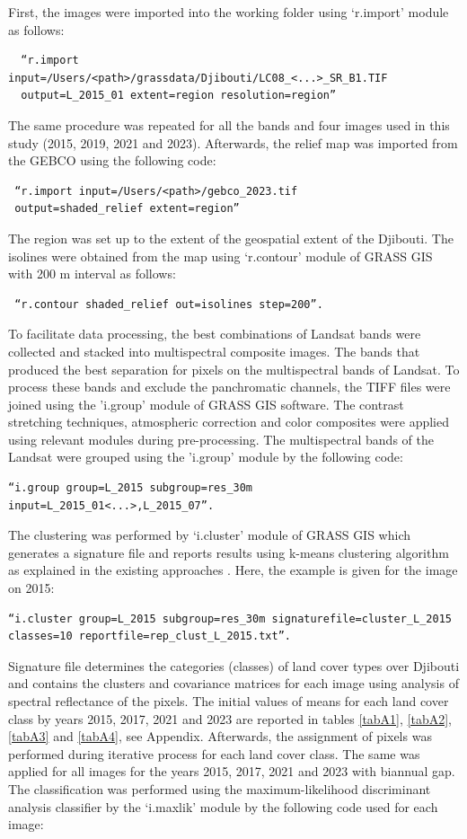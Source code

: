 \documentclass[jimaging,article,submit,pdftex,moreauthors]{Definitions/mdpi}
\begin{document}
First, the images were imported into the working folder using ‘r.import’ module as follows: 
\begin{verbatim}
  “r.import input=/Users/<path>/grassdata/Djibouti/LC08_<...>_SR_B1.TIF 
  output=L_2015_01 extent=region resolution=region”
\end{verbatim}
The same procedure was repeated for all the bands and four images used in this study (2015, 2019, 2021 and 2023). Afterwards, the relief map was imported from the GEBCO using the following code: 
\begin{verbatim}
 “r.import input=/Users/<path>/gebco_2023.tif 
 output=shaded_relief extent=region”
\end{verbatim}
The region was set up to the extent of the geospatial extent of the Djibouti. The isolines were obtained from the map using ‘r.contour’ module of GRASS GIS with 200 m interval as follows: 
\begin{verbatim}
 “r.contour shaded_relief out=isolines step=200”.
\end{verbatim}
 
To facilitate data processing, the best combinations of Landsat bands were collected and stacked into multispectral composite images. The bands that produced the best separation for pixels on the multispectral bands of Landsat. To process these bands and exclude the panchromatic channels, the TIFF files were joined using the 'i.group' module of GRASS GIS software. The contrast stretching techniques, atmospheric correction and color composites were applied using relevant modules during pre-processing. The multispectral bands of the Landsat were grouped using the 'i.group' module by the following code: 

\begin{verbatim}
“i.group group=L_2015 subgroup=res_30m 
input=L_2015_01<...>,L_2015_07”.
\end{verbatim}

The clustering was performed by ‘i.cluster’ module of GRASS GIS which generates a signature file and reports results using k-means clustering algorithm as explained in the existing approaches \cite{5930121,10430357,Lemenkova202315,5739741}. Here, the example is given for the image on 2015: 
\begin{verbatim}
“i.cluster group=L_2015 subgroup=res_30m signaturefile=cluster_L_2015 
classes=10 reportfile=rep_clust_L_2015.txt”. 
\end{verbatim}

Signature file determines the categories (classes) of land cover types over Djibouti and contains the clusters and covariance matrices for each image using analysis of spectral reflectance of the pixels. The initial values of means for each land cover class by years 2015, 2017, 2021 and 2023 are reported in tables \ref{tabA1}, \ref{tabA2}, \ref{tabA3} and \ref{tabA4}, see Appendix. Afterwards, the assignment of pixels was performed during iterative process for each land cover class. The same was applied for all images for the years 2015, 2017, 2021 and 2023 with biannual gap. The classification was performed using the maximum-likelihood discriminant analysis classifier by the ‘i.maxlik’ module \cite{Balha2022,CHOWDHURY2024100800,Lemenkova202323} by the following code used for each image: 
\end{document}
